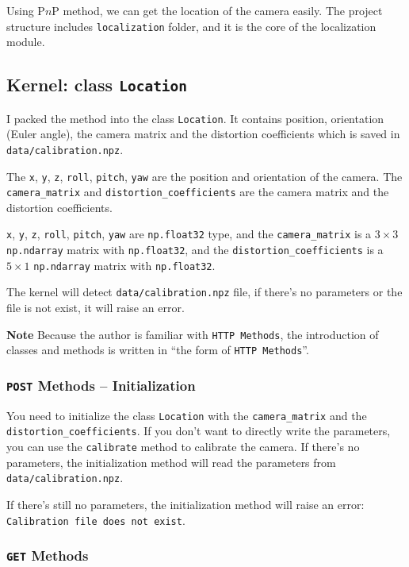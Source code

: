 \documentclass{article}
\begin{document}
Using P$n$P method, we can get the location of the camera easily. The project structure includes \texttt{localization} folder, and it is the core of the localization module.

\subsection{Kernel: class \texttt{Location}}

I packed the method into the class \texttt{Location}. It contains position, orientation (Euler angle), the camera matrix and the distortion coefficients which is saved in \texttt{data/calibration.npz}.

The \texttt{x}, \texttt{y}, \texttt{z}, \texttt{roll}, \texttt{pitch}, \texttt{yaw} are the position and orientation of the camera. The \texttt{camera\_matrix} and \texttt{distortion\_coefficients} are the camera matrix and the distortion coefficients.

\texttt{x}, \texttt{y}, \texttt{z}, \texttt{roll}, \texttt{pitch}, \texttt{yaw} are \texttt{np.float32} type, and the \texttt{camera\_matrix} is a $3\times3$ \texttt{np.ndarray} matrix with \texttt{np.float32}, and the \texttt{distortion\_coefficients} is a $5\times1$ \texttt{np.ndarray} matrix with \texttt{np.float32}.

The kernel will detect \texttt{data/calibration.npz} file, if there's no parameters or the file is not exist, it will raise an error.

\textbf{Note} Because the author is familiar with \texttt{HTTP Methods}, the introduction of classes and methods is written in ``the form of \texttt{HTTP Methods}''.

\subsubsection{\texttt{POST} Methods -- Initialization}

You need to initialize the class \texttt{Location} with the \texttt{camera\_matrix} and the \texttt{distortion\_coefficients}. If you don't want to directly write the parameters, you can use the \texttt{calibrate} method to calibrate the camera. If there's no parameters, the initialization method will read the parameters from \texttt{data/calibration.npz}.

If there's still no parameters, the initialization method will raise an error: \texttt{Calibration file does not exist}.


\subsubsection{\texttt{GET} Methods}
\end{document}
